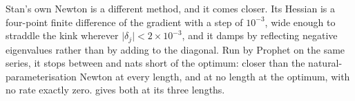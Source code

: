 Stan's own Newton is a different method, and it comes closer. Its Hessian is a
four-point finite difference of the gradient with a step of $10^{-3}$, wide enough
to straddle the kink wherever $\lvert\delta_j\rvert < 2\times10^{-3}$, and it damps by
reflecting negative eigenvalues rather than by adding to the diagonal. Run by
Prophet on the same series, it stops between \NewtonStanMin{} and \NewtonStanMax{}
nats short of the optimum: closer than the natural-parameterisation Newton at every
length, and at no length at the optimum, with no rate exactly zero. 
gives both at its three lengths.
